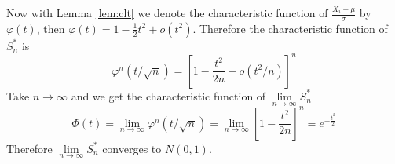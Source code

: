 \documentclass{article}
\theoremstyle{definition}
\theoremstyle{plain}
\theoremstyle{remark}
\begin{document}
\noindent Now with Lemma \ref{lem:clt} we denote the characteristic function of $\frac{X_i-\mu}{\sigma}$ by $\varphi(t)$, then  $\varphi(t)=1-\frac12t^2+o(t^2)$. Therefore the characteristic function of $S_n^*$ is 
$$\varphi^n(t/\sqrt{n})=[1-\frac{t^2}{2n}+o(t^2/n)]^n$$
Take $n\to\infty$ and we get the characteristic function of $\lim\limits_{n\to\infty}S^*_n$
$$\varPhi(t)=\lim\limits_{n\to\infty}\varphi^n(t/\sqrt{n})
=\lim\limits_{n\to\infty}[1-\frac{t^2}{2n}]^n=e^{-\frac{t^2}2}$$
Therefore $\lim\limits_{n\to\infty}S_n^*$ converges to $N(0,1)$.
\medskip



\end{document}
